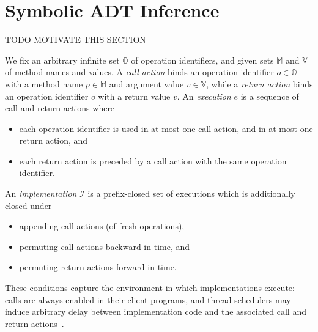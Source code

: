 \section{Symbolic ADT Inference}
\label{sec:inference}

TODO MOTIVATE THIS SECTION

We fix an arbitrary infinite set $\mathbb{O}$ of operation identifiers, and
given sets $\mathbb{M}$ and $\mathbb{V}$ of method names and values. A
\emph{call action} binds an operation identifier $o \in \mathbb{O}$ with a
method name $p \in \mathbb{M}$ and argument value $v \in \mathbb{V}$, while a
\emph{return action} binds an operation identifier $o$ with a return value $v$.
An \emph{execution} $e$ is a sequence of call and return actions where
\begin{itemize}

  \item each operation identifier is used in at most one call action, and in at
  most one return action, and

  \item each return action is preceded by a call action with the same operation
  identifier.

\end{itemize}
An \emph{implementation} $\mathcal{I}$ is a prefix-closed set of executions
which is additionally closed under
\begin{itemize}

  \item appending call actions (of fresh operations),

  \item permuting call actions backward in time, and

  \item permuting return actions forward in time.

\end{itemize}
These conditions capture the environment in which implementations execute:
calls are always enabled in their client programs, and thread schedulers may
induce arbitrary delay between implementation code and the associated call and
return actions~\cite{conf/popl/BouajjaniEEH15}.

